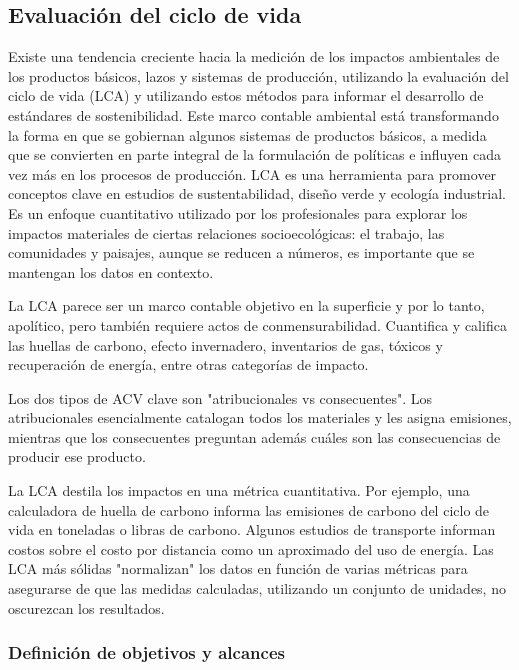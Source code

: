 \documentclass[runningheads]{llncs}
\begin{document}
\subsection{Evaluación del ciclo de vida}
\bigskip
 Existe una tendencia creciente hacia la medición de los impactos ambientales de los productos básicos, lazos y sistemas de producción, utilizando la evaluación del ciclo de vida (LCA) y utilizando estos métodos para informar el desarrollo de estándares de sostenibilidad. Este marco contable ambiental está transformando la forma en que se gobiernan algunos sistemas de productos básicos, a medida que se convierten en parte integral de la formulación de políticas e influyen cada vez más en los procesos de producción. LCA es una herramienta para promover conceptos clave en estudios de sustentabilidad, diseño verde y ecología industrial. Es un enfoque cuantitativo utilizado por los profesionales para explorar los impactos materiales de ciertas relaciones socioecológicas: el trabajo, las comunidades y paisajes, aunque se reducen a números, es importante que se mantengan los datos en contexto.

\bigskip
La LCA parece ser un marco contable objetivo en la superficie y por lo tanto, apolítico, pero también requiere actos de conmensurabilidad. Cuantifica y califica las huellas de carbono, efecto invernadero, inventarios de gas, tóxicos y recuperación de energía, entre otras categorías de impacto.

\bigskip
Los dos tipos de ACV clave son "atribucionales vs consecuentes". Los atribucionales esencialmente catalogan todos los materiales y les asigna emisiones, mientras que los consecuentes preguntan además cuáles son las consecuencias de producir ese producto.

\bigskip
La LCA destila los impactos en una métrica cuantitativa. Por ejemplo, una calculadora de huella de carbono informa las emisiones de carbono del ciclo de vida en toneladas o libras de carbono. Algunos estudios de transporte informan costos sobre el costo por distancia como un aproximado del uso de energía. Las LCA más sólidas "normalizan" los datos en función de varias métricas para asegurarse de que las medidas calculadas, utilizando un conjunto de unidades, no oscurezcan los resultados.

\subsubsection{Definición de objetivos y alcances}
\end{document}
